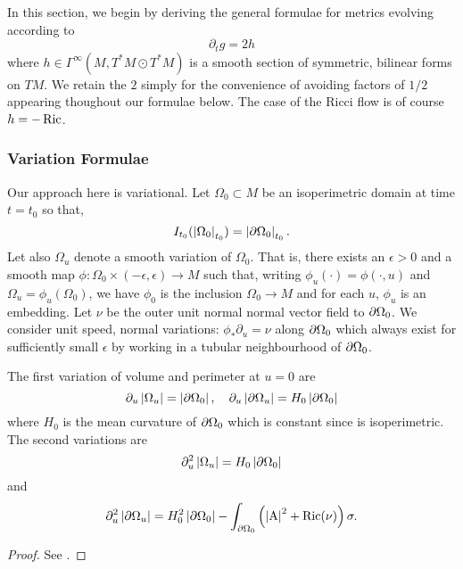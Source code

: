 \documentclass{amsart}
\begin{document}
In this section, we begin by deriving the general formulae for metrics evolving according to
\begin{equation}
\label{eq:dtg}
\partial_t g = 2h
\end{equation}
where \(h \in \Gamma^{\infty}(M, T^{\ast}M \odot T^{\ast} M)\) is a smooth section of symmetric, bilinear forms on \(TM\). We retain the \(2\) simply for the convenience of avoiding factors of \(1/2\) appearing thoughout our formulae below. The case of the Ricci flow is of course \(h = -\operatorname{Ric}\).

\subsubsection{Variation Formulae}
\label{subsec:iso_diff_ineq_variation}

Our approach here is variational. Let \(\Omega_0 \subset M\) be an isoperimetric domain at time \(t = t_0\) so that,
\[
I_{t_0} (\left|{\Omega_0}\right|_{t_0}) = \left|{\partial {\Omega_0}}\right|_{t_0}.
\]
Let also \(\Omega_u\) denote a smooth variation of \(\Omega_0\). That is, there exists an \(\epsilon > 0\) and a smooth map \(\phi: \Omega_0 \times (-\epsilon, \epsilon) \to M\) such that, writing \(\phi_u(\cdot) = \phi(\cdot, u)\) and \(\Omega_u = \phi_u(\Omega_0)\), we have \(\phi_0\) is the inclusion \(\Omega_0 \to M\) and for each \(u\), \(\phi_u\) is an embedding. Let \(\nu\) be the outer unit normal normal vector field to \(\partial {\Omega_0}\). We consider unit speed, normal variations: \(\phi_{\ast} \partial_u = \nu\) along \(\partial {\Omega_0}\) which always exist for sufficiently small \(\epsilon\) by working in a tubular neighbourhood of \(\partial {\Omega_0}\).

\begin{lemma}
\label{lem:spatial_variation}
The first variation of volume and perimeter at \(u = 0\) are
\[
\partial_u \left|{\Omega_u}\right| = \left|{\partial {\Omega_0}}\right|, \quad \partial_u \left|{\partial {\Omega_u}}\right| = H_0 \left|{\partial {\Omega_0}}\right|
\]
where \(H_0\) is the mean curvature of \(\partial {\Omega_0}\) which is constant since is isoperimetric. The second variations are
\[
\partial_u^2 \left|{\Omega_u}\right| = H_0 \left|{\partial {\Omega_0}}\right|
\]
and
\[
\partial_u^2 \left|{\partial {\Omega_u}}\right| = H_0^2 \left|{\partial {\Omega_0}}\right| - \int_{\partial {\Omega_0}} \left(\left|{\operatorname{A}}\right|^2 + \operatorname{Ric}(\nu)\right) \sigma.
\]
\end{lemma}

\begin{proof}
See \cite[Chapter 1]{Li:/2012}.
\end{proof}
\end{document}
